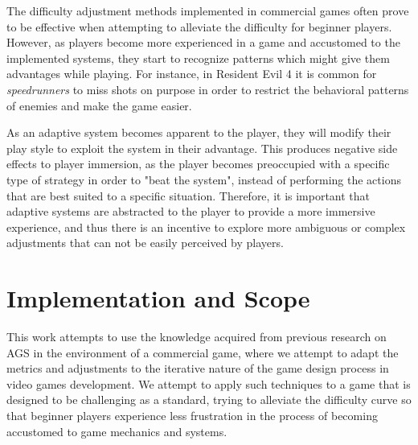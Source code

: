
The difficulty adjustment methods implemented in commercial games often prove to be effective when attempting to alleviate the difficulty for beginner players. However, as players become more experienced in a game and accustomed to the implemented systems, they start to recognize patterns which might give them advantages while playing. For instance, in Resident Evil 4 it is common for \emph{speedrunners} to miss shots on purpose in order to restrict the behavioral patterns of enemies and make the game easier.

As an adaptive system becomes apparent to the player, they will modify their play style to exploit the system in their advantage. This produces negative side effects to player immersion, as the player becomes preoccupied with a specific type of strategy in order to "beat the system", instead of performing the actions that are best suited to a specific situation. Therefore, it is important that adaptive systems are abstracted to the player to provide a more immersive experience, and thus there is an incentive to explore more ambiguous or complex adjustments that can not be easily perceived by players.


\section{Implementation and Scope}

This work attempts to use the knowledge acquired from previous research on AGS in the environment of a commercial game, where we attempt to adapt the metrics and adjustments to the iterative nature of the game design process in video games development. We attempt to apply such techniques to a game that is designed to be challenging as a standard, trying to alleviate the difficulty curve so that beginner players experience less frustration in the process of becoming accustomed to game mechanics and systems.

